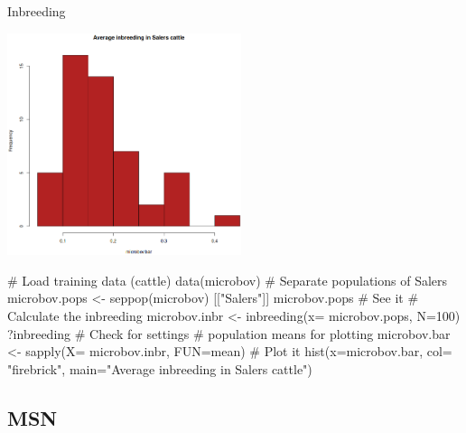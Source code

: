 \documentclass[compress, xelatex, 11pt, xcolor=svgnames, aspectratio=169,
	hyperref={
		bookmarks=true,
		unicode=true,
		colorlinks=true,
		pdftitle={Molecular data in R},
		plainpages=false,
		pdfauthor={Vojtech Zeisek},
		pdfsubject={Course about phylogeny and evolution in R},
		pdfcreator={XeLaTeX},
		pdfkeywords={R, evolution, phylogeny, molecular data},
		linkcolor=Crimson, %
		anchorcolor=Magenta, %
		citecolor=Magenta, %
		filecolor=Magenta, %
		menucolor=Magenta, %
		urlcolor=DodgerBlue, %
		},
	url={hyphens, lowtilde} %
	]{beamer}
\begin{document}
\begin{frame}[fragile]{Inbreeding}
	\begin{multicols}{2}
		\includegraphics[height=6.5cm]{inbreeding.png}
		\begin{spluscode}
    # Load training data (cattle)
    data(microbov)
    # Separate populations of Salers
    microbov.pops <- seppop(microbov)
      [["Salers"]]
    microbov.pops # See it
    # Calculate the inbreeding
    microbov.inbr <- inbreeding(x=
      microbov.pops, N=100)
    ?inbreeding # Check for settings
    # population means for plotting
    microbov.bar <- sapply(X=
      microbov.inbr, FUN=mean)
    # Plot it
    hist(x=microbov.bar, col=
      "firebrick", main="Average
      inbreeding in Salers cattle")
		\end{spluscode}
	\end{multicols}
\end{frame}


\subsection{MSN}
\end{document}
